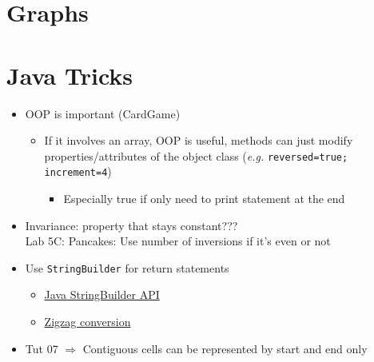 \documentclass{article}
\newcommand{\eg}[0]{\textit{e.g. }}
\begin{document}
\begin{multicols}{2}
\section{Graphs}

\section{Java Tricks}
\begin{itemize}
	\item OOP is important (CardGame)
	\begin{itemize}
		\item If it involves an array, OOP is useful, methods can just modify properties/attributes of the object class (\eg \texttt{reversed=true; increment=4})
		\begin{itemize}
			\item Especially true if only need to print statement at the end
		\end{itemize}
	\end{itemize}
	\item Invariance: property that stays constant???\\
	Lab 5C: Pancakes: Use number of inversions if it's even or not
	\item Use \texttt{StringBuilder} for return statements
	\begin{itemize}
		\item \href{https://docs.oracle.com/javase/7/docs/api/java/lang/StringBuilder.html}{Java StringBuilder API}
		\item \href{https://leetcode.com/problems/zigzag-conversion/solution/}{Zigzag conversion}
	\end{itemize}
    \item Tut 07 $\Rightarrow$ Contiguous cells can be represented by start and end only

\end{itemize}

\end{multicols}
\end{document}

